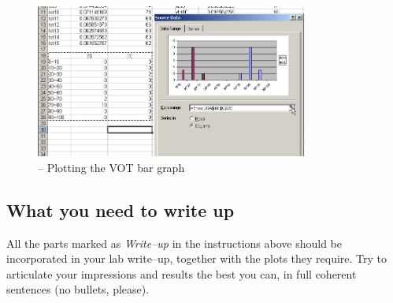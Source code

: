 \begin{figure}[!tbp]
\caption{\MSExcel{} -- Plotting the VOT bar graph}
\label{step7VOT}
	\begin{center}
		\includegraphics[width=0.8\textwidth]{./figures/Part-C-VOT-thedotthetot-Excel04}
	\end{center}
\end{figure}
 
\subsection{What you need to write up}

All the parts marked as \emph{Write--up} in the instructions above should be incorporated in your lab write--up, together with the plots they require. Try to articulate your impressions and results the best you can, in full coherent sentences (no bullets, please).


